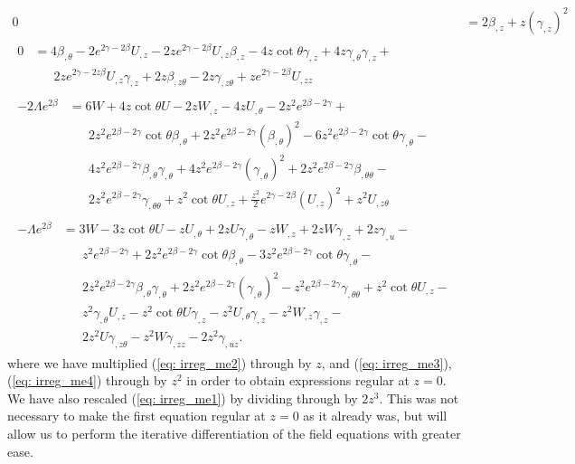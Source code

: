 \documentclass[a4paper,11pt]{article}
\numberwithin{equation}{section}
\begin{document}
\begin{subequations}
\begin{align}
0&=2 \beta_{, z} +z (\gamma_{,z})^2 \\ 
\begin{split}
0&= 4 \beta_{, \theta} - 2 e^{2\gamma - 2\beta} U_{,z}-2ze^{2\gamma-2\beta} U_{,z}\beta_{,z}-4z\cot \theta \gamma_{,z}+ 4z\gamma_{, \theta}\gamma_{,z}+\\
& \phantom{aaa}2z e^{2\gamma- 2z\beta} U_{,z} \gamma_{,z} +2z \beta_{,z\theta}-2z\gamma_{, z \theta}+ze^{2\gamma-2\beta} U_{, zz} 
\end{split}
\\
\begin{split}
-2\Lambda e^{2\beta} & = 6W+4z \cot \theta U - 2z W_{, z} - 4z U_{, \theta} - 2z^2e^{2\beta -2\gamma}+\\
& \phantom{aaa} 2z^2e^{2\beta-2\gamma}\cot \theta \beta_{, \theta}+ 2z^2e^{2\beta-2\gamma}(\beta_{, \theta})^2-6z^2e^{2\beta-2\gamma}\cot \theta \gamma_{, \theta}-\\
& \phantom{aaa} 4z^2e^{2\beta-2\gamma}\beta_{, \theta} \gamma_{, \theta}+4z^2e^{2\beta-2\gamma}(\gamma_{,\theta})^2+ 2z^2e^{2\beta-2\gamma}\beta_{, \theta \theta}-\\
& \phantom{aaa} 2z^2e^{2\beta-2\gamma}\gamma_{, \theta \theta}+z^2\cot \theta U_{,z}+\frac{z^2}{2}e^{2\gamma-2\beta}(U_{,z})^2+z^2U_{,z \theta} 
\end{split}
\\
\begin{split}
-\Lambda e^{2\beta} & =3W-3z\cot \theta U- zU_{,\theta}+2zU \gamma_{, \theta}-zW_{,z}+2zW \gamma_{,z}+2z\gamma_{,u}- \\
& \phantom{aaa} z^2e^{2\beta-2\gamma}+ 2z^2 e^{2\beta - 2\gamma} \cot \theta \beta_{, \theta} - 3z^2 e^{2\beta -2\gamma}\cot \theta \gamma_{, \theta}-\\
& \phantom{aaa} 2z^2e^{2\beta -2\gamma}\beta_{, \theta} \gamma_{, \theta} + 2z^2e^{2\beta -2\gamma}(\gamma_{, \theta})^2-z^2e^{2\beta -2\gamma}\gamma_{, \theta \theta}+z^2\cot \theta U_{, z} -\\
& \phantom{aaa} z^2\gamma_{, \theta} U_{,z}-z^2\cot \theta U \gamma_{, z}- z^2 U_{, \theta} \gamma_{, z} -z^2 W_{,z}\gamma_{,z}-\\
& \phantom{aaa} 2z^2U \gamma_{,z \theta} - z^2W\gamma_{,zz}-2z^2\gamma_{, u z}.
\end{split}
\end{align}
\end{subequations}
where we have multiplied (\ref{eq: irreg_me2}) through by $z$, and (\ref{eq: irreg_me3}), (\ref{eq: irreg_me4}) through by $z^2$ in order to obtain expressions regular at $z=0$. We have also rescaled (\ref{eq: irreg_me1}) by dividing through by $2z^3$. This was not necessary to make the first equation regular at $z=0$ as it already was, but will allow us to perform the iterative differentiation of the field equations with greater ease. 
\end{document}

